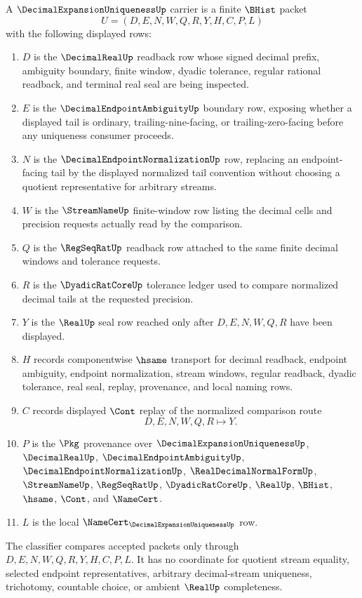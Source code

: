 \begin{definition}
\label{def:decimal-expansion-uniqueness-carrier}
A $\DecimalExpansionUniquenessUp$ carrier is a finite $\BHist$ packet
$$
U=(D,E,N,W,Q,R,Y,H,C,P,L)
$$
with the following displayed rows:
\begin{enumerate}
\item $D$ is the $\DecimalRealUp$ readback row whose signed decimal prefix, ambiguity boundary, finite window, dyadic tolerance, regular rational readback, and terminal real seal are being inspected.
\item $E$ is the $\DecimalEndpointAmbiguityUp$ boundary row, exposing whether a displayed tail is ordinary, trailing-nine-facing, or trailing-zero-facing before any uniqueness consumer proceeds.
\item $N$ is the $\DecimalEndpointNormalizationUp$ row, replacing an endpoint-facing tail by the displayed normalized tail convention without choosing a quotient representative for arbitrary streams.
\item $W$ is the $\StreamNameUp$ finite-window row listing the decimal cells and precision requests actually read by the comparison.
\item $Q$ is the $\RegSeqRatUp$ readback row attached to the same finite decimal windows and tolerance requests.
\item $R$ is the $\DyadicRatCoreUp$ tolerance ledger used to compare normalized decimal tails at the requested precision.
\item $Y$ is the $\RealUp$ seal row reached only after $D,E,N,W,Q,R$ have been displayed.
\item $H$ records componentwise $\hsame$ transport for decimal readback, endpoint ambiguity, endpoint normalization, stream windows, regular readback, dyadic tolerance, real seal, replay, provenance, and local naming rows.
\item $C$ records displayed $\Cont$ replay of the normalized comparison route
$$
D,E,N,W,Q,R \longmapsto Y .
$$
\item $P$ is the $\Pkg$ provenance over $\DecimalExpansionUniquenessUp$, $\DecimalRealUp$, $\DecimalEndpointAmbiguityUp$, $\DecimalEndpointNormalizationUp$, $\RealDecimalNormalFormUp$, $\StreamNameUp$, $\RegSeqRatUp$, $\DyadicRatCoreUp$, $\RealUp$, $\BHist$, $\hsame$, $\Cont$, and $\NameCert$.
\item $L$ is the local $\NameCert_{\DecimalExpansionUniquenessUp}$ row.
\end{enumerate}
The classifier compares accepted packets only through $D,E,N,W,Q,R,Y,H,C,P,L$. It has no coordinate for quotient stream equality, selected endpoint representatives, arbitrary decimal-stream uniqueness, trichotomy, countable choice, or ambient $\RealUp$ completeness.
\end{definition}

